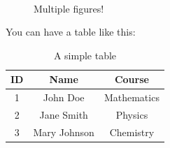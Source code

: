 \begin{figure}[H]
	\centering
	 \\
	\caption{Multiple figures!}
\end{figure}

You can have a table like this:
\begin{table}[H]
	\centering
	\label{tab:simple_table}
	\caption{A simple table}
	\begin{tabular}{|c|c|c|}
		\hline
		\textbf{ID} & \textbf{Name} & \textbf{Course} \\
		\hline
		1 & John Doe & Mathematics \\
		2 & Jane Smith & Physics \\
		3 & Mary Johnson & Chemistry \\
		\hline
	\end{tabular}
\end{table}

